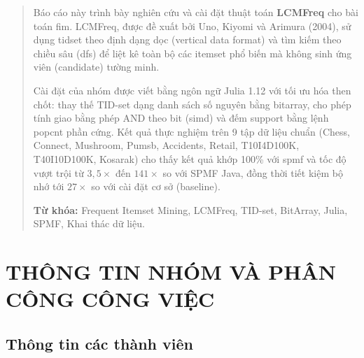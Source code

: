 \documentclass[12pt,a4paper]{article}
\theoremstyle{definition}
\begin{document}
\begin{titlepage}
    \vfill

\end{titlepage}

\begin{abstract}
Báo cáo này trình bày nghiên cứu và cài đặt thuật toán \textbf{LCMFreq} cho bài toán \gls{fim}.
LCMFreq, được đề xuất bởi Uno, Kiyomi và Arimura (2004), sử dụng \gls{tidset} theo định dạng dọc (vertical data format) và tìm kiếm theo chiều sâu (\gls{dfs}) để liệt kê toàn bộ các \gls{itemset} phổ biến mà không sinh ứng viên (candidate) tường minh.

Cài đặt của nhóm được viết bằng ngôn ngữ Julia 1.12 với tối ưu hóa then chốt: thay thế TID-set dạng danh sách số nguyên bằng \gls{bitarray}, cho phép tính giao bằng phép AND theo bit (\gls{simd}) và đếm \gls{support} bằng lệnh \gls{popcnt} phần cứng. Kết quả thực nghiệm trên 9 tập dữ liệu chuẩn (Chess, Connect, Mushroom, Pumsb, Accidents, Retail, T10I4D100K, T40I10D100K, Kosarak) cho thấy kết quả khớp 100\% với \gls{spmf} và tốc độ vượt trội từ $3{,}5\times$ đến $141\times$ so với SPMF Java, đồng thời tiết kiệm bộ nhớ tới $27\times$ so với cài đặt cơ sở (baseline).

\textbf{Từ khóa:} Frequent Itemset Mining, LCMFreq, TID-set, BitArray, Julia, SPMF, Khai thác dữ liệu.
\end{abstract}

\newpage
\tableofcontents
\newpage
\listoftables
\newpage
\listoffigures
\newpage
\printglossary[title={Danh sách Thuật ngữ và Ký hiệu}, toctitle={Danh sách Thuật ngữ}]
\newpage

\section{THÔNG TIN NHÓM VÀ PHÂN CÔNG CÔNG VIỆC}

\subsection{Thông tin các thành viên}
\end{document}
